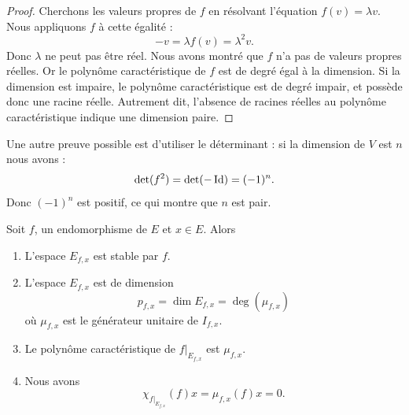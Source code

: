\begin{proof}
    Cherchons les valeurs propres de \( f\) en résolvant l'équation \( f(v)=\lambda v\). Nous appliquons \( f\) à cette égalité :
    \begin{equation}
        -v=\lambda f(v)=\lambda^2v.
    \end{equation}
    Donc \( \lambda\) ne peut pas être réel. Nous avons montré que \( f\) n'a pas de valeurs propres réelles. Or le polynôme caractéristique de \( f\) est de degré égal à la dimension. Si la dimension est impaire, le polynôme caractéristique est de degré impair, et possède donc une racine réelle. Autrement dit, l'absence de racines réelles au polynôme caractéristique indique une dimension paire.
\end{proof}

Une autre preuve possible est d'utiliser le déterminant : si la dimension de \( V\) est \( n\) nous avons :
\begin{equation}
    \mathop{\mathrm{det}}\nolimits(f^2)=\mathop{\mathrm{det}}\nolimits(-\operatorname{Id})=(-1)^n.
\end{equation}
Donc \( (-1)^n\) est positif, ce qui montre que \( n\) est pair.

\begin{proposition}\label{PropNrZGhT}
    Soit \( f\), un endomorphisme de \( E\) et \( x\in E\). Alors
    \begin{enumerate}
        \item
            L'espace \( E_{f,x}\) est stable par \( f\).
        \item\label{ItemfzKOCo}
            L'espace \( E_{f,x}\) est de dimension
            \begin{equation}
                p_{f,x}=\dim E_{f,x}=\deg(\mu_{f,x})
            \end{equation}
            où \( \mu_{f,x}\) est le générateur unitaire de \( I_{f,x}\).
        \item   \label{ItemKHNExH}
            Le polynôme caractéristique de \( f|_{E_{f,x}}\) est \( \mu_{f,x}\).
        \item   \label{ItemHMviZw}
            Nous avons
            \begin{equation}
                \chi_{f|_{E_{f,x}}}(f)x=\mu_{f,x}(f)x=0.
            \end{equation}
    \end{enumerate}
\end{proposition}

